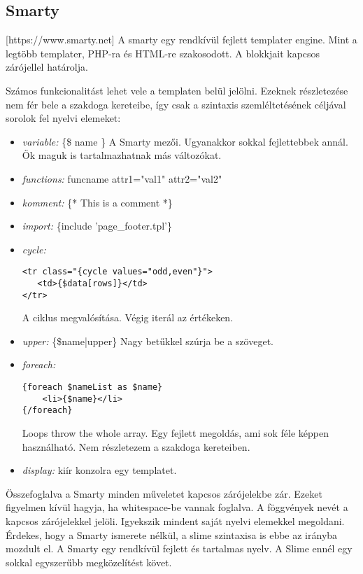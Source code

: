 \subsection{Smarty}
[https://www.smarty.net]
A smarty egy rendkívül fejlett templater engine.
Mint a legtöbb templater, PHP-ra és  HTML-re szakosodott.
A blokkjait kapcsos zárójellel határolja.

Számos funkcionalitást lehet vele a templaten belül jelölni.
Ezeknek részletezése nem fér bele a szakdoga kereteibe, így csak a szintaxis szemléltetésének céljával sorolok fel nyelvi elemeket:

\begin{itemize}
\item \emph{variable: }
\{\$ name \}
A Smarty mezői.
Ugyanakkor sokkal fejlettebbek annál.
Ők maguk is tartalmazhatnak más változókat. 
\item \emph{functions: }
{funcname attr1="val1" attr2="val2"}
\item \emph{komment: } 
\{* This is a comment *\}
\item \emph{import: } 
\{include 'page\_footer.tpl'\}
\item \emph{cycle: }
\begin{verbatim}
<tr class="{cycle values="odd,even"}">
   <td>{$data[rows]}</td>
</tr>
\end{verbatim}
A ciklus megvalósítása. 
Végig iterál az értékeken.
\item \emph{upper: } 
\{\$name|upper\}
Nagy betűkkel szúrja be a szöveget.
\item \emph{foreach: } 
\begin{verbatim}
{foreach $nameList as $name}
    <li>{$name}</li>
{/foreach}
\end{verbatim}
Loops throw the whole array.
Egy fejlett megoldás, ami sok féle képpen használható.
Nem részletezem a szakdoga kereteiben.
\item \emph{display: } 
kiír konzolra egy templatet.
\end{itemize}

Összefoglalva a Smarty minden műveletet kapcsos zárójelekbe zár.
Ezeket figyelmen kívül hagyja, ha whitespace-be vannak foglalva.
A föggvények nevét a kapcsos zárójelekkel jelöli.
Igyekszik mindent saját nyelvi elemekkel megoldani.
Érdekes, hogy a Smarty ismerete nélkül, a slime szintaxisa is ebbe az irányba mozdult el.
A Smarty egy rendkívül fejlett és tartalmas nyelv.
A Slime ennél egy sokkal egyszerűbb megközelítést követ.

